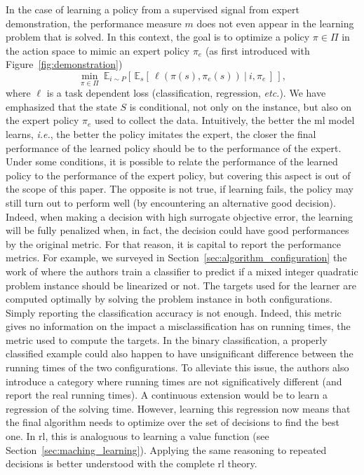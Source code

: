 \documentclass[11pt]{article}
\begin{document}
		In the case of learning a policy from a supervised signal from expert demonstration, the
		performance measure $m$ does not even appear in the learning problem that is solved.
		In this context, the goal is to optimize a policy $\pi \in \Pi$ in the action space to mimic an
		expert policy $\pi_e$ (as first introduced with Figure~\ref{fig:demonstration})
		\begin{equation}
			\label{eq:behavior_cloning}
			\min_{\pi \in \Pi}\ \mathbb{E}_{i \sim P}
			\left [ \,
			    \mathbb{E}_{s} [\, \ell(\pi(s), \pi_e(s))\ |\ i, \pi_e \,]
			\, \right ],
		\end{equation}
		where $\ell$ is a task dependent loss (classification, regression, \textit{etc.}).
		We have emphasized that the state $S$ is conditional, not only on the instance, but also on the
		expert policy $\pi_e$ used to collect the data.
		Intuitively, the better the \gls{ml} model learns, \textit{i.e.}, the better the policy imitates
		the expert, the closer the final performance of the learned policy should be to the performance of
		the expert.
		Under some conditions, it is possible to relate the performance of the learned policy to the
		performance of the expert policy, but covering this aspect is out of the scope of this paper.
		The opposite is not true, if learning fails, the policy may still turn out to perform well (by
		encountering an alternative good decision).
		Indeed, when making a decision with high surrogate objective error, the learning will be fully
		penalized when, in fact, the decision could have good performances by the original metric.
		For that reason, it is capital to report the performance metrics.
		For example, we surveyed in Section~\ref{sec:algorithm_configuration} the work of
		\cite{BonamiLearningClassificationMixedInteger2018} where the authors train a classifier to predict
		if a mixed integer quadratic problem instance should be linearized or not.
		The targets used for the learner are computed optimally by solving the problem instance in both
		configurations.
		Simply reporting the classification accuracy is not enough.
		Indeed, this metric gives no information on the impact a misclassification has on running times,
		the metric used to compute the targets.
		In the binary classification, a properly classified example could also happen to have unsignificant
		difference between the running times of the two configurations.
		To alleviate this issue, the authors also introduce a category where running times are not
		significatively different (and report the real running times).
		A continuous extension would be to learn a regression of the solving time.
		However, learning this regression now means that the final algorithm needs to optimize over the set
		of decisions to find the best one.
		In \gls{rl}, this is analoguous to learning a value function (see Section~\ref{sec:maching_learning}).
		Applying the same reasoning to repeated decisions is better understood with the complete \gls{rl}
		theory.
\end{document}
